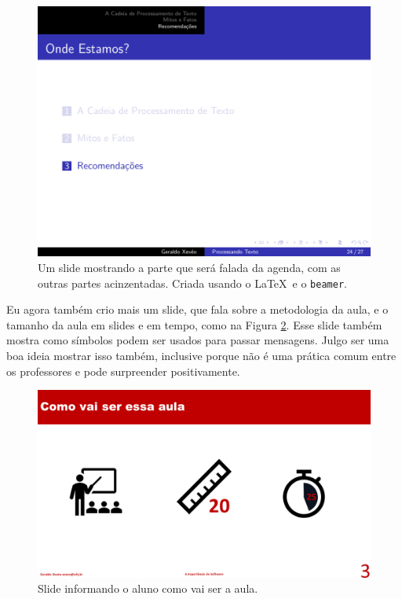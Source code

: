\documentclass{article}
\def\tam{0.6}
\begin{document}
\begin{figure}[hb]
    \centering
    \includegraphics[width=\tam\linewidth]{imagens/agendadomeio.png}
    \caption{Um slide mostrando a parte que será falada da agenda, com as outras partes acinzentadas. Criada usando o \LaTeX\  e o \texttt{beamer}.}
    \label{fig:meio}
\end{figure}

Eu agora também crio mais um slide, que fala sobre a metodologia da aula, e o tamanho da aula em slides e em tempo, como na Figura \ref{fig:metodologia}. Esse slide também mostra como símbolos podem ser usados para passar mensagens. Julgo ser  uma boa ideia mostrar isso também, inclusive porque não é uma prática comum entre os professores e pode surpreender positivamente.

\begin{figure}[htb]
    \centering
    \includegraphics[width=\tam\linewidth]{imagens/metodologia.png}
    \caption{Slide informando o aluno como vai ser a aula.}
    \label{fig:metodologia}
\end{figure}
\end{document}
